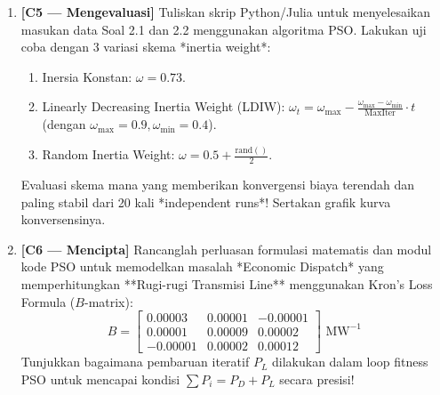\documentclass[11pt,a4paper]{article}
\begin{document}
\begin{enumerate}[label=\textbf{3.\arabic*}, leftmargin=*]
    \item \textbf{[C5 --- Mengevaluasi]} Tuliskan skrip Python/Julia untuk menyelesaikan masukan data Soal 2.1 dan 2.2 menggunakan algoritma PSO. Lakukan uji coba dengan 3 variasi skema *inertia weight*:
    \begin{enumerate}[label=(\alph*)]
        \item Inersia Konstan: $\omega = 0.73$.
        \item Linearly Decreasing Inertia Weight (LDIW): $\omega_t = \omega_{\max} - \frac{\omega_{\max} - \omega_{\min}}{\text{MaxIter}} \cdot t$ (dengan $\omega_{\max}=0.9, \omega_{\min}=0.4$).
        \item Random Inertia Weight: $\omega = 0.5 + \frac{\text{rand}()}{2}$.
    \end{enumerate}
    Evaluasi skema mana yang memberikan konvergensi biaya terendah dan paling stabil dari 20 kali *independent runs*! Sertakan grafik kurva konversensinya.

    \item \textbf{[C6 --- Mencipta]} Rancanglah perluasan formulasi matematis dan modul kode PSO untuk memodelkan masalah *Economic Dispatch* yang memperhitungkan **Rugi-rugi Transmisi Line** menggunakan Kron's Loss Formula ($B$-matrix):
    \[
        B = \begin{bmatrix} 0.00003 & 0.00001 & -0.00001 \\ 0.00001 & 0.00009 & 0.00002 \\ -0.00001 & 0.00002 & 0.00012 \end{bmatrix} \text{ MW}^{-1}
    \]
    Tunjukkan bagaimana pembaruan iteratif $P_L$ dilakukan dalam loop fitness PSO untuk mencapai kondisi $\sum P_i = P_D + P_L$ secara presisi!
\end{enumerate}
\end{document}
